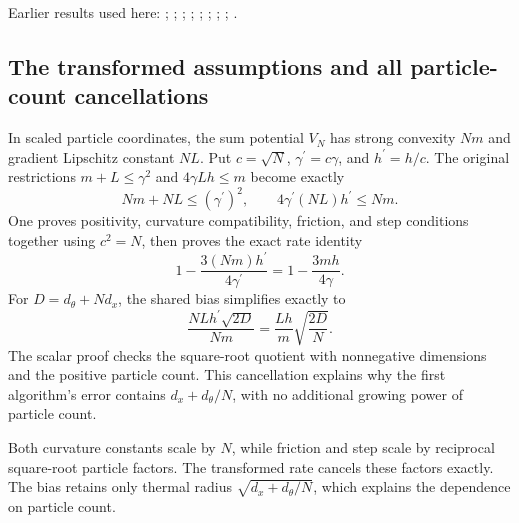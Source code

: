 \documentclass[11pt,a4paper]{report}
\begin{document}
Earlier results used here: \cite[Section~3.33.6]{LangevinLean2026ULASC}; \cite[Section~3.8.17]{LangevinLean2026ULASC}; \cite[Section~3.1.1]{LangevinLean2026IPLA}; \cite[Section~3.1.4]{LangevinLean2026IPLA}; \cite[Section~3.114.3]{LangevinLean2026Kinetic}; \cite[Section~3.12.2]{LangevinLean2026Kinetic}; \cite[Section~3.36.1]{LangevinLean2026Kinetic}; \cite[Section~3.36.2]{LangevinLean2026Kinetic}; \cite[Section~3.57.14]{LangevinLean2026Kinetic}.
\subsection{\texorpdfstring{The transformed assumptions and all particle-count cancellations}{The transformed assumptions and all particle-count cancellations}}
\label{report-step-KIPLMC-CanonicalExponential-lean-2}


In scaled particle coordinates, the sum potential \(V_N\) has strong convexity \(Nm\) and gradient Lipschitz constant \(NL\). Put \(c=\sqrt N\), \(\gamma^\prime=c\gamma\), and \(h^\prime=h/c\). The original restrictions \(m+L\le\gamma^2\) and \(4\gamma Lh\le m\) become exactly \[Nm+NL\le(\gamma^\prime)^2,\qquad4\gamma^\prime(NL)h^\prime\le Nm.\] One proves positivity, curvature compatibility, friction, and step conditions together using \(c^2=N\), then proves the exact rate identity \[1-\frac{3(Nm)h^\prime}{4\gamma^\prime}=1-\frac{3mh}{4\gamma}.\] For \(D=d_\theta+Nd_x\), the shared bias simplifies exactly to \[\frac{NLh^\prime\sqrt{2D}}{Nm}=\frac{Lh}{m}\sqrt{\frac{2D}{N}}.\] The scalar proof checks the square-root quotient with nonnegative dimensions and the positive particle count. This cancellation explains why the first algorithm’s error contains \(d_x+d_\theta/N\), with no additional growing power of particle count.



Both curvature constants scale by \(N\), while friction and step scale by reciprocal square-root particle factors. The transformed rate cancels these factors exactly. The bias retains only thermal radius \(\sqrt{d_x+d_\theta/N}\), which explains the dependence on particle count.
\end{document}
